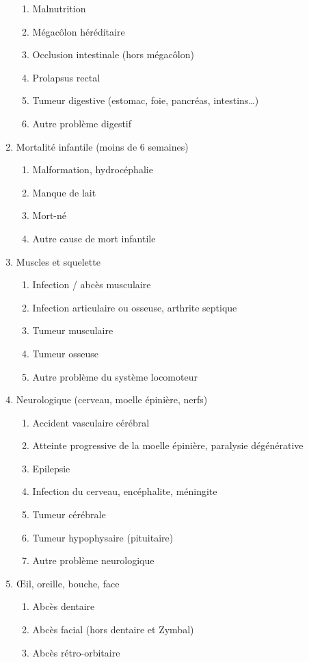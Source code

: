 \documentclass[a4paper,10pt]{article}
\begin{document}
\begin{enumerate}
\begin{enumerate}
\item Malnutrition
\item Mégacôlon héréditaire
\item Occlusion intestinale (hors mégacôlon)
\item Prolapsus rectal
\item Tumeur digestive (estomac, foie, pancréas, intestins…)
\item Autre problème digestif
\end{enumerate}
\item Mortalité infantile (moins de 6 semaines)
\begin{enumerate}
\item Malformation, hydrocéphalie
\item Manque de lait
\item Mort-né
\item Autre cause de mort infantile
\end{enumerate}
\item Muscles et squelette
\begin{enumerate}
\item Infection / abcès musculaire
\item Infection articulaire ou osseuse, arthrite septique
\item Tumeur musculaire
\item Tumeur osseuse
\item Autre problème du système locomoteur
\end{enumerate}
\item Neurologique (cerveau, moelle épinière, nerfs)
\begin{enumerate}
\item Accident vasculaire cérébral
\item Atteinte progressive de la moelle épinière, paralysie dégénérative
\item Epilepsie
\item Infection du cerveau, encéphalite, méningite
\item Tumeur cérébrale
\item Tumeur hypophysaire (pituitaire)
\item Autre problème neurologique
\end{enumerate} 
\item Œil, oreille, bouche, face
\begin{enumerate}
\item Abcès dentaire
\item Abcès facial (hors dentaire et Zymbal)
\item Abcès rétro-orbitaire

\end{enumerate}
\end{enumerate}
\end{document}

